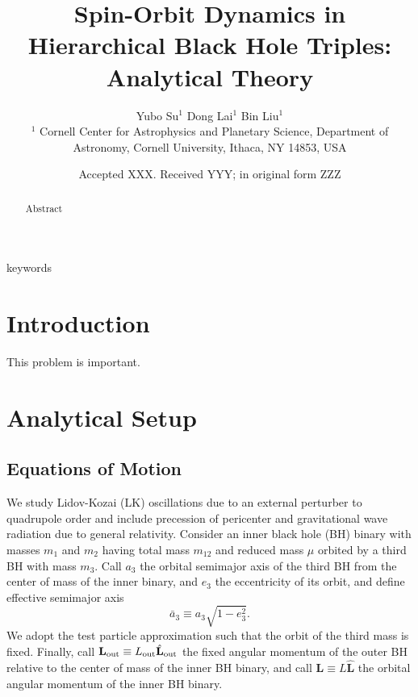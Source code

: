 \documentclass[
        fleqn,
        usenatbib,
    ]{mnras}
\title[BH Triple Spin-Orbit Dynamics]{Spin-Orbit Dynamics in Hierarchical Black
Hole Triples: Analytical Theory}
\author[Authors]{
Yubo Su$^1$
Dong Lai$^1$
Bin Liu$^1$
\\
$^1$ Cornell Center for Astrophysics and Planetary Science, Department of
Astronomy, Cornell University, Ithaca, NY 14853, USA
}
\date{Accepted XXX\@. Received YYY\@; in original form ZZZ}
\newcommand*{\bm}[1]{\boldsymbol{\mathbf{#1}}}
\newcommand*{\uv}[1]{\hat{\bm{#1}}}
\begin{document}
\label{firstpage}
\pagerange{\pageref{firstpage}--\pageref{lastpage}}
\maketitle

\begin{abstract}
    Abstract
\end{abstract}

\begin{keywords}
keywords %
\end{keywords}

\section{Introduction}

This problem is important.

\section{Analytical Setup}

\subsection{Equations of Motion}

We study Lidov-Kozai (LK) oscillations due to an external perturber to
quadrupole order and include precession of pericenter and gravitational wave
radiation due to general relativity. Consider an inner black hole (BH) binary
with masses $m_1$ and $m_2$ having total mass $m_{12}$ and reduced mass $\mu$
orbited by a third BH with mass $m_3$. Call $a_3$ the orbital semimajor axis of
the third BH from the center of mass of the inner binary, and $e_3$ the
eccentricity of its orbit, and define effective semimajor axis
\begin{equation}
    \bar{a}_3 \equiv a_3\sqrt{1 - e_3^2}.
\end{equation}
We adopt the test particle approximation such that the orbit of the third mass
is fixed. Finally, call $\bm{L}_{\rm out} \equiv L_{\rm out} \uv{L}_{\rm out}$
the fixed angular momentum of the outer BH relative to the center of mass of the
inner BH binary, and call $\bm{L} \equiv L \uv{L}$ the orbital angular momentum
of the inner BH binary.
\end{document}

